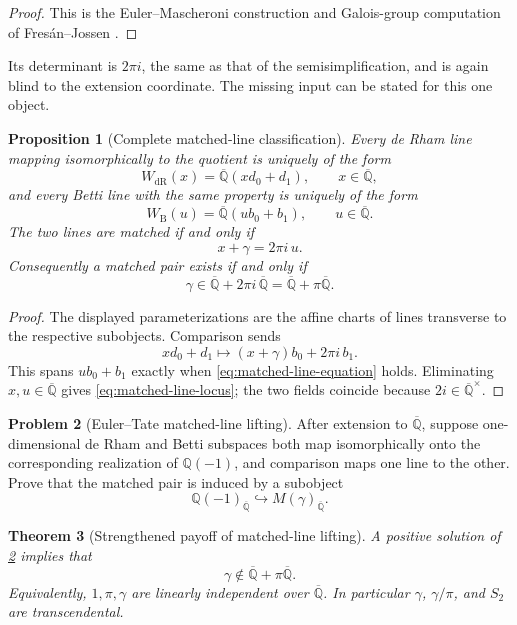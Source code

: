 \documentclass[11pt]{article}
\theoremstyle{keio}
\newtheorem{theorem}{Theorem}[section]
\newtheorem{proposition}[theorem]{Proposition}
\theoremstyle{definition}
\newtheorem{problem}[theorem]{Problem}
\theoremstyle{remark}
\newcommand{\Q}{\mathbb Q}
\newcommand{\Qbar}{\overline{\mathbb Q}}
\begin{document}
\begin{proof}
This is the Euler--Mascheroni construction and Galois-group computation of
Fres\'an--Jossen \cite[\S12.8]{FresanJossen2024}.
\end{proof}

Its determinant is \(2\pi i\), the same as that of the semisimplification,
and is again blind to the extension coordinate.  The missing input can be
stated for this one object.

\begin{proposition}[Complete matched-line classification]
\label{prop:matched-line-classification}
Every de Rham line mapping isomorphically to the quotient is uniquely of
the form
\[
 W_{\mathrm{dR}}(x)=\Qbar(xd_0+d_1),\qquad x\in\Qbar,
\]
and every Betti line with the same property is uniquely of the form
\[
 W_{\mathrm B}(u)=\Qbar(ub_0+b_1),\qquad u\in\Qbar.
\]
The two lines are matched if and only if
\begin{equation}\label{eq:matched-line-equation}
 \boxed{x+\gamma=2\pi i\,u.}
\end{equation}
Consequently a matched pair exists if and only if
\begin{equation}\label{eq:matched-line-locus}
 \boxed{\gamma\in\Qbar+2\pi i\,\Qbar
              =\Qbar+\pi\Qbar.}
\end{equation}
\end{proposition}

\begin{proof}
The displayed parameterizations are the affine charts of lines transverse
to the respective subobjects.  Comparison sends
\[
 xd_0+d_1\longmapsto(x+\gamma)b_0+2\pi i\,b_1.
\]
This spans \(ub_0+b_1\) exactly when
\eqref{eq:matched-line-equation} holds.  Eliminating \(x,u\in\Qbar\)
gives \eqref{eq:matched-line-locus}; the two fields coincide because
\(2i\in\Qbar^\times\).
\end{proof}

\begin{problem}[Euler--Tate matched-line lifting]
\label{prob:euler-tate-fullness}
After extension to \(\Qbar\), suppose one-dimensional de Rham and Betti
subspaces both map isomorphically onto the corresponding realization of
\(\Q(-1)\), and comparison maps one line to the other.  Prove that the
matched pair is induced by a subobject
\[
 \Q(-1)_{\Qbar}\hookrightarrow M(\gamma)_{\Qbar}.
\]
\end{problem}

\begin{theorem}[Strengthened payoff of matched-line lifting]
\label{thm:matched-line-implies-gamma}
A positive solution of \cref{prob:euler-tate-fullness} implies that
\begin{equation}\label{eq:matched-line-payoff}
 \boxed{\gamma\notin\Qbar+\pi\Qbar.}
\end{equation}
Equivalently, \(1,\pi,\gamma\) are linearly independent over \(\Qbar\).
In particular \(\gamma\), \(\gamma/\pi\), and \(S_2\) are transcendental.
\end{theorem}
\end{document}
